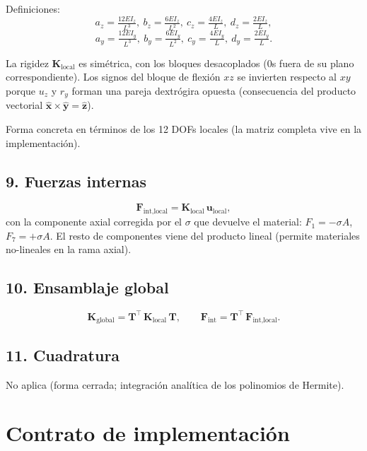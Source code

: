 \documentclass[11pt,letterpaper,oneside]{report}
\begin{document}
Definiciones:
\[
a_z = \tfrac{12EI_z}{L^3},\ b_z = \tfrac{6EI_z}{L^2},\ c_z = \tfrac{4EI_z}{L},\ d_z = \tfrac{2EI_z}{L},
\]
\[
a_y = \tfrac{12EI_y}{L^3},\ b_y = \tfrac{6EI_y}{L^2},\ c_y = \tfrac{4EI_y}{L},\ d_y = \tfrac{2EI_y}{L}.
\]

La rigidez $\mathbf K_{\text{local}}$ es simétrica, con los bloques desacoplados (0s fuera de su plano correspondiente). Los signos del bloque de flexión $xz$ se invierten respecto al $xy$ porque $u_z$ y $r_y$ forman una pareja dextrógira opuesta (consecuencia del producto vectorial $\hat{\mathbf x}\times\hat{\mathbf y}=\hat{\mathbf z}$).

Forma concreta en términos de los 12 DOFs locales (la matriz completa vive en la implementación).

\subsection{9. Fuerzas internas}
\[
\mathbf F_{\text{int,local}} = \mathbf K_{\text{local}}\,\mathbf u_{\text{local}},
\]
con la componente axial corregida por el $\sigma$ que devuelve el material: $F_1 = -\sigma A$, $F_7 = +\sigma A$. El resto de componentes viene del producto lineal (permite materiales no-lineales en la rama axial).

\subsection{10. Ensamblaje global}
\[
\mathbf K_{\text{global}} = \mathbf T^\top\,\mathbf K_{\text{local}}\,\mathbf T, \qquad \mathbf F_{\text{int}} = \mathbf T^\top\,\mathbf F_{\text{int,local}}.
\]

\subsection{11. Cuadratura}
No aplica (forma cerrada; integración analítica de los polinomios de Hermite).


\section{Contrato de implementación}
\end{document}
